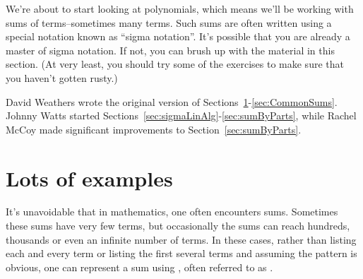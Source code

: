 


We're about to start looking at polynomials, which means we'll be working with sums of terms--sometimes many terms. Such sums are often written using a special notation known as ``sigma notation''.  It's possible that you are already a master of sigma notation. If not, you can brush up with the material in this section. (At very least, you should try some of the exercises to make sure that you haven't gotten rusty.)
\bigskip

David Weathers wrote the original version of Sections~\ref{sec:sigmaExamples}-\ref{sec:CommonSums}. Johnny Watts started Sections~\ref{sec:sigmaLinAlg}-\ref{sec:sumByParts}, while  Rachel McCoy made significant improvements to Section~\ref{sec:sumByParts}.

\section{Lots of examples\quad
{}}\label{sec:sigmaExamples}

It's unavoidable that in mathematics, one often encounters sums.  Sometimes these sums have very few terms, but occasionally the sums can reach hundreds, thousands or even an infinite number of terms.  In these cases, rather than listing each and every term or listing the first several terms and assuming the pattern is obvious, one can represent a sum using , often referred to as . 

